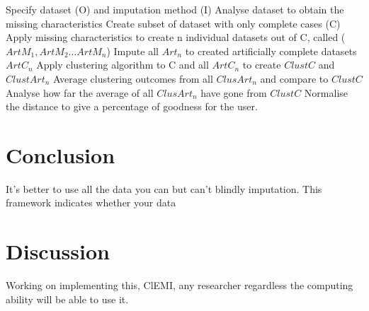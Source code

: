 \documentclass{IEEEconf}
\begin{document}
		Specify dataset (O) and imputation method (I)
		Analyse dataset to obtain the missing characteristics
		Create subset of dataset with only complete cases (C)
		Apply missing characteristics to create n individual datasets out of C, called ($ArtM_{1}, ArtM_{2}...ArtM_{n}$)
		Impute all $Art_{n}$ to created artificially complete datasets $ArtC_{n}$
		Apply clustering algorithm to C and all $ArtC_{n}$ to create $ClustC$ and $ClustArt_{n}$
		Average clustering outcomes from all $ClusArt_{n}$ and compare to $ClustC$
		Analyse how far the average of all $ClusArt_{n}$ have gone from $ClustC$
		Normalise the distance to give a percentage of goodness for the user.

	\section{Conclusion} %
	\label{sec:conclusion}
	It's better to use all the data you can but can't blindly imputation. This framework indicates whether your data 

	\section{Discussion} %
	\label{sec:discussion}
	Working on implementing this, ClEMI, any researcher regardless the computing ability will be able to use it. 

	
	
\end{document}
